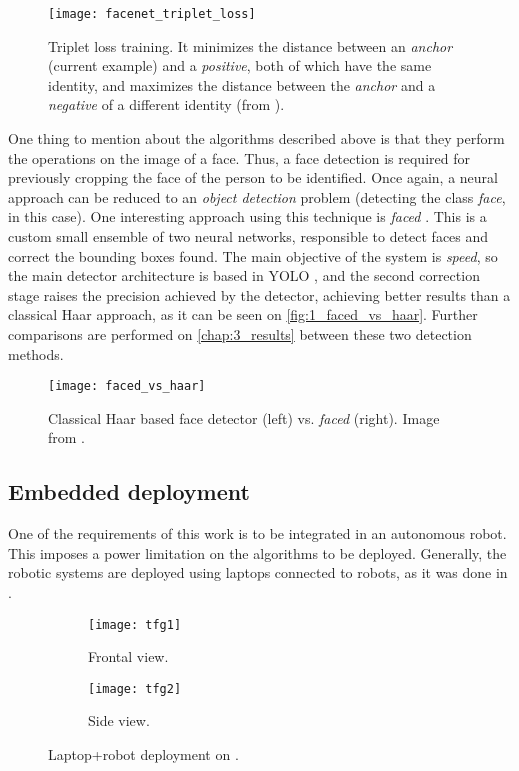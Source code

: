\begin{figure}[h]
	\centering
	\texttt{[image: facenet\_triplet\_loss]}
	\caption{Triplet loss training. It minimizes the distance between an \emph{anchor} (current example) and a \emph{positive}, both of which have the same identity, and maximizes the distance between the \emph{anchor} and a \emph{negative} of a different identity (from \cite{facenet}).}
	\label{fig:1_facenet_triplet_loss}
\end{figure}


One thing to mention about the algorithms described above is that they perform the operations on the image of a face. Thus, a face detection is required for previously cropping the face of the person to be identified. Once again, a neural approach can be reduced to an \textit{object detection} problem (detecting the class \textit{face}, in this case). One interesting approach using this technique is \textit{faced} \cite{faced}. This is a custom small ensemble of two neural networks, responsible to detect faces and correct the bounding boxes found. The main objective of the system is \textit{speed}, so the main detector architecture is based in YOLO \cite{yolov1}, and the second correction stage raises the precision achieved by the detector, achieving better results than a classical Haar approach, as it can be seen on \autoref{fig:1_faced_vs_haar}. Further comparisons are performed on \autoref{chap:3_results} between these two detection methods.

\begin{figure}[h]
	\centering
	\texttt{[image: faced\_vs\_haar]}
	\caption{Classical Haar based face detector \cite{violajones} (left) vs. \textit{faced} (right). Image from \cite{faced}.}
	\label{fig:1_faced_vs_haar}
\end{figure}


\subsection{Embedded deployment}
One of the requirements of this work is to be integrated in an autonomous robot. This imposes a power limitation on the algorithms to be deployed. Generally, the robotic systems are deployed using laptops connected to robots, as it was done in \cite{tfg}.

\begin{figure}[h]
	\centering
	\begin{subfigure}[h]{0.4\linewidth}
		\texttt{[image: tfg1]}
		\caption{Frontal view.}
		\label{fig:1_turtlebot_front}
	\end{subfigure}
	\begin{subfigure}[h]{0.4\linewidth}
		\texttt{[image: tfg2]}
		\caption{Side view.}
		\label{fig:1_turtlebot_side}
	\end{subfigure}
	\caption{Laptop+robot deployment on \cite{tfg}.}
	\label{fig:1_real_tfg}
\end{figure}

